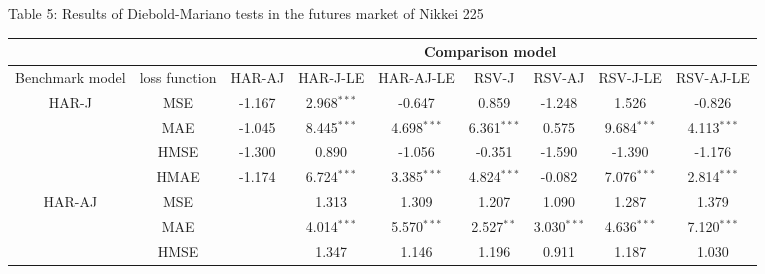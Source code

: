 \documentclass[10pt]{article}
\begin{document}
\newpage
\fontsize{11pt}{14pt}\selectfont
\begin{landscape}
\begin{center}
Table 5: Results of Diebold-Mariano tests in the futures market of Nikkei 225
\end{center}

\begin{center}
\begin{tabular}{c|c|ccccccc} \hline      
                         &                    &\multicolumn{7}{c}{Comparison model} \\ \hline 
Benchmark  model&loss function   &HAR-AJ     &HAR-J-LE                     & HAR-AJ-LE                &RSV-J                       &RSV-AJ                   &RSV-J-LE                     & RSV-AJ-LE     \\ \hline 
HAR-J                &  MSE            & -1.167        &2.968$^{\ast \ast \ast}$ &-0.647                        & 0.859                        &-1.248                        & 1.526                         &-0.826             \\
                         &  MAE            & -1.045        &8.445$^{\ast \ast \ast}$ &4.698$^{\ast \ast \ast}$&6.361$^{\ast \ast \ast}$& 0.575                        & 9.684$^{\ast \ast \ast}$&4.113$^{\ast \ast \ast}$             \\
                         &  HMSE          & -1.300        &0.890                           &-1.056                        &-0.351                        &-1.590                        &-1.390                        &-1.176            \\
                         &  HMAE          & -1.174        &6.724$^{\ast \ast \ast}$ &3.385$^{\ast \ast \ast}$ &4.824$^{\ast \ast \ast}$&-0.082                        &7.076$^{\ast \ast \ast}$&2.814$^{\ast \ast \ast}$            \\  \hline
HAR-AJ            &  MSE            &                    &1.313                          &1.309                            &1.207                        &1.090                          &1.287                         &1.379            \\
                        &  MAE            &                    &4.014$^{\ast \ast \ast}$&5.570$^{\ast \ast \ast}$&2.527$^{\ast \ast }$       &3.030$^{\ast \ast \ast}$ &4.636$^{\ast \ast \ast}$&7.120$^{\ast \ast \ast}$             \\
                        &  HMSE          &                    &1.347                         &1.146                              &1.196                       &0.911                           &1.187                         &1.030            \\

\end{tabular}
\end{center}
\end{landscape}
\end{document}
